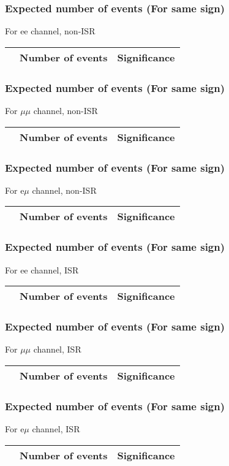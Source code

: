 \begin{frame}
\frametitle{Expected number of events (For same sign)}
For ee channel, non-ISR\\
\vspace{5mm}
\begin{tabular}{|c|c|c|}
\hline
& Number of events & Significance \\
\hline

\end{tabular}
\end{frame}

\begin{frame}
\frametitle{Expected number of events (For same sign)}
For $\mu\mu$ channel, non-ISR\\
\vspace{5mm}
\begin{tabular}{|c|c|c|}
\hline
& Number of events & Significance \\
\hline

\end{tabular}
\end{frame}

\begin{frame}
\frametitle{Expected number of events (For same sign)}
For e$\mu$ channel, non-ISR\\
\vspace{5mm}
\begin{tabular}{|c|c|c|}
\hline
& Number of events & Significance \\
\hline

\end{tabular}
\end{frame}

\begin{frame}
\frametitle{Expected number of events (For same sign)}
For ee channel, ISR\\
\vspace{5mm}
\begin{tabular}{|c|c|c|}
\hline
& Number of events & Significance \\
\hline

\end{tabular}
\end{frame}

\begin{frame}
\frametitle{Expected number of events (For same sign)}
For $\mu\mu$ channel, ISR\\
\vspace{5mm}
\begin{tabular}{|c|c|c|}
\hline
& Number of events & Significance \\
\hline

\end{tabular}
\end{frame}

\begin{frame}
\frametitle{Expected number of events (For same sign)}
For e$\mu$ channel, ISR\\
\vspace{5mm}
\begin{tabular}{|c|c|c|}
\hline
& Number of events & Significance \\
\hline

\end{tabular}
\end{frame}

